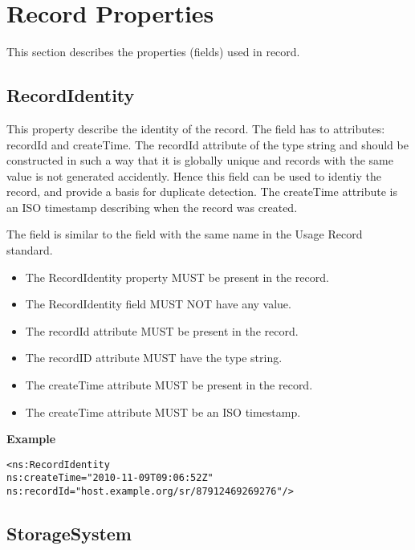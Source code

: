 
\section{Record Properties}

This section describes the properties (fields) used in record.


\subsection{RecordIdentity}

This property describe the identity of the record. The field has to attributes:
recordId and createTime. The recordId attribute of the type string and should
be constructed in such a way that it is globally unique and records with the
same value is not generated accidently. Hence this field can be used to identiy
the record, and provide a basis for duplicate detection. The createTime
attribute is an ISO timestamp describing when the record was created.

The field is similar to the field with the same name in the Usage Record
standard.

\begin{itemize}
\item The RecordIdentity property MUST be present in the record.
\item The RecordIdentity field MUST NOT have any value.
\item The recordId attribute MUST be present in the record.
\item The recordID attribute MUST have the type string.
\item The createTime attribute MUST be present in the record.
\item The createTime attribute MUST be an ISO timestamp.
\end{itemize}

{\bf Example}
\begin{verbatim}
<ns:RecordIdentity
ns:createTime="2010-11-09T09:06:52Z"
ns:recordId="host.example.org/sr/87912469269276"/>
\end{verbatim}


\subsection{StorageSystem}

